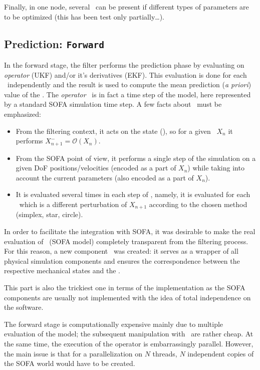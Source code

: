 \documentclass[10pt]{article}
\begin{document}
Finally, in one node, several  \opr\ can be present if different types of parameters are to be optimized (this has been test only partially\ldots).

\subsection{Prediction: \texttt{Forward}}
In the forward stage, the filter performs the prediction phase by evaluating on \emph{operator} (UKF) and/or it's derivatives (EKF). This evaluation
is done for each \smp\ independently and the 
result is used to compute the mean prediction (\emph{a priori}) value of the \sstate. The \emph{operator} \op\ is in fact a time step of the model,
here represented by a standard SOFA simulation time step.
A few facts about \op\ must be emphasized:
\begin{itemize}
\item From the filtering context, it acts on the state (\sstate), so for a given \sstate\ $X_n$ it performs $X^-_{n+1} =
\mathcal{O}(X_{n})$.  
\item From the SOFA point of view, it performs a single step of the simulation on a given DoF positions/velocities (encoded as a part of $X_n$)  while
taking into account the current parameters (also encoded as a part of $X_n$).
\item It is evaluated several times in each step of \ssda, namely, it is evaluated for each \smp\ which is a different perturbation of $X_{n+1}$
according to the chosen method (simplex, star, circle). 
\end{itemize}

In order to facilitate the integration with SOFA, it was desirable to make the real evaluation of \op\ (SOFA model) completely transparent
from the filtering process. 
For this reason, a new component \ssw\  was created: it serves as a wrapper of all physical simulation components and ensures the correspondence between the respective mechanical states and the \sstate.

This part is also the trickiest one in terms of the implementation as the SOFA components are usually not implemented with the idea of total independence on the software.

The forward stage is computationally  expensive mainly due to multiple evaluation of the model; the subsequent manipulation with \sstate\ are rather cheap. At the same time, the execution of the operator is embarrassingly parallel. However, the main issue is that for a parallelization on $N$ threads, $N$ independent copies of the SOFA world would have to be created.
\end{document}
